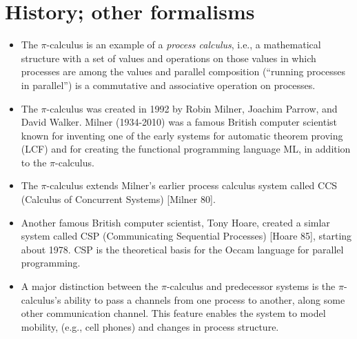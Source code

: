 \documentclass[letterpaper,10pt,openany,oneside]{sphinxmanual}
\begin{document}
\chapter{History; other formalisms}
\label{History/History::doc}\label{History/History:history-other-formalisms}\begin{itemize}
\item {} 
The $\pi$-calculus is an example of a \emph{process calculus}, i.e., a mathematical structure with a set of values and operations on those values in which processes are among the values and parallel composition (``running processes in parallel'') is a commutative and associative operation on processes.

\item {} 
The $\pi$-calculus was created in 1992 by Robin Milner, Joachim Parrow, and David Walker. Milner (1934-2010) was a famous British computer scientist known for inventing one of the early systems for automatic theorem proving (LCF) and for creating the functional programming language ML, in addition to the $\pi$-calculus.

\item {} 
The $\pi$-calculus extends Milner's earlier process calculus system called CCS (Calculus of Concurrent Systems) {[}Milner 80{]}.

\item {} 
Another famous British computer scientist, Tony Hoare, created a simlar system called CSP (Communicating Sequential Processes) {[}Hoare 85{]}, starting about 1978. CSP is the theoretical basis for the Occam language for parallel programming.

\item {} 
A major distinction between the $\pi$-calculus and predecessor systems is the $\pi$-calculus's ability to pass a channels from one process to another, along some other communication channel. This feature enables the system to model mobility, (e.g., cell phones) and changes in process structure.

\end{itemize}



\renewcommand{\indexname}{Index}
\printindex
\end{document}
